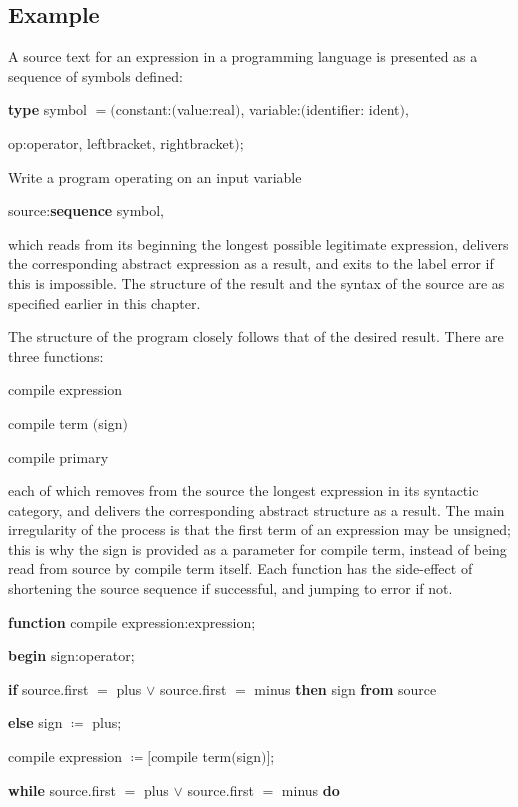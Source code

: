 \subsection{Example}
\label{sec:example-9-2}

A source text for an expression in a programming language is presented as a sequence of symbols defined:

\quad \textbf{type} symbol $= ($constant:$($value:real$)$, variable:$($identifier: ident$)$,

\tabto*{9.2em}op:operator, leftbracket, rightbracket$)$;

Write a program operating on an input variable

\quad source:\textbf{sequence} symbol,

\noindent
which reads from its beginning the longest possible legitimate expression, delivers the corresponding abstract expression as a result, and exits to the label error if this is impossible. The structure of the result and the syntax of the source are as specified earlier in this chapter.

The structure of the program closely follows that of the desired result. There are three functions:

\quad compile expression

\quad compile term $($sign$)$

\quad compile primary

\noindent
each of which removes from the source the longest expression in its syntactic category, and delivers the corresponding abstract structure as a result. The main irregularity of the process is that the first term of an expression may be unsigned; this is why the sign is provided as a parameter for compile term, instead of being read from source by compile term itself. Each function has the side-effect of shortening the source sequence if successful, and jumping to error if not.

\noindent
\textbf{function} compile expression:expression;

\noindent
\quad \textbf{begin} sign:operator;

\noindent
\quad \quad \textbf{if} source.first $=$ plus $\vee$ source.first $=$ minus \textbf{then} sign \textbf{from} source

\noindent
\quad \quad \textbf{else} sign $\coloneq$ plus;

\noindent
\quad \quad compile expression $\coloneq [$compile term$($sign$)]$;

\noindent
\quad \quad \textbf{while} source.first $=$ plus $\vee$ source.first $=$ minus \textbf{do}

